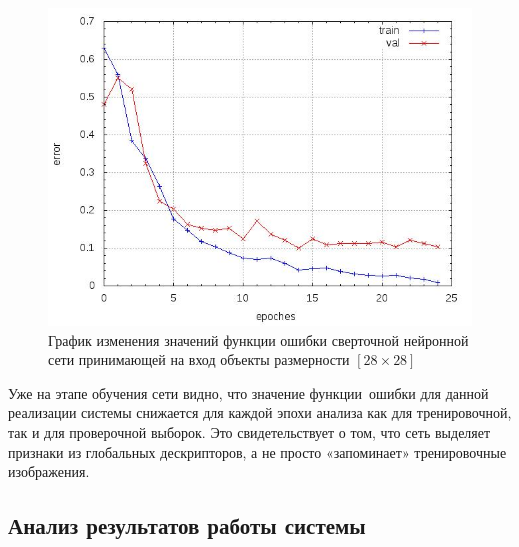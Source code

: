 \documentclass[14pt]{article}
\numberwithin{figure}{section}
\numberwithin{equation}{section}
\begin{document}
\begin{figure}[h]
   \begin{center}
       \includegraphics[scale=0.7] {12.JPG}
       \caption{График изменения значений функции ошибки сверточной нейронной сети принимающей на вход объекты размерности $[28 \times 28]$}
       \label{ris:12}
   \end{center}
\end{figure}

Уже на этапе обучения сети видно, что значение функции ошибки для данной реализации системы снижается для каждой эпохи анализа как для тренировочной, так и для проверочной выборок. Это свидетельствует о том, что сеть выделяет признаки из глобальных дескрипторов, а не просто «запоминает» тренировочные изображения.

\subsection{Анализ результатов работы системы}


\end{document}
